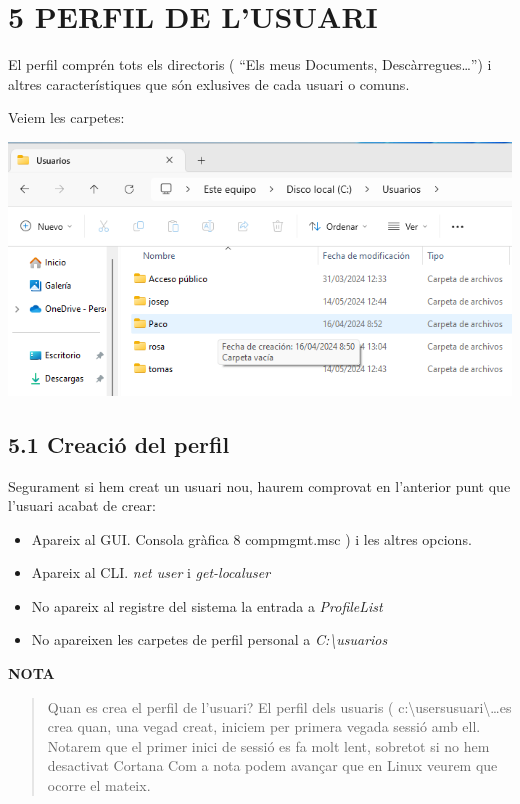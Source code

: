 \documentclass[
  a4paper,
]{article}
\providecommand{\tightlist}{%
  \setlength{\itemsep}{0pt}\setlength{\parskip}{0pt}}
\begin{document}
\section{5 PERFIL DE L'USUARI}\label{perfil-de-lusuari}

El perfil comprén tots els directoris ( ``Els meus Documents,
Descàrregues\ldots{}'') i altres característiques que són exlusives de
cada usuari o comuns.

Veiem les carpetes:

\includegraphics{png/users.png}

\subsection{5.1 Creació del perfil}\label{creaciuxf3-del-perfil}

Segurament si hem creat un usuari nou, haurem comprovat en l'anterior
punt que l'usuari acabat de crear:

\begin{itemize}
\tightlist
\item
  Apareix al GUI. Consola gràfica 8 compmgmt.msc ) i les altres opcions.
\item
  Apareix al CLI. \emph{net user} i \emph{get-localuser}
\item
  No apareix al registre del sistema la entrada a \emph{ProfileList}
\item
  No apareixen les carpetes de perfil personal a
  \emph{C:\textbackslash usuarios}
\end{itemize}

\textbf{NOTA}

\begin{quote}
Quan es crea el perfil de l'usuari? El perfil dels usuaris (
c:\textbackslash users\textbar usuari\textbackslash\ldots es crea quan,
una vegad creat, iniciem per primera vegada sessió amb ell. Notarem que
el primer inici de sessió es fa molt lent, sobretot si no hem desactivat
Cortana Com a nota podem avançar que en Linux veurem que ocorre el
mateix.
\end{quote}
\end{document}
